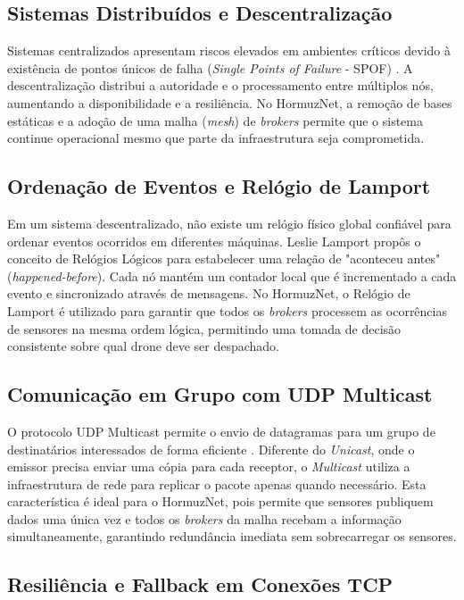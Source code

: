 \subsection{Sistemas Distribuídos e Descentralização}

Sistemas centralizados apresentam riscos elevados em ambientes críticos devido à existência de pontos únicos de falha (\textit{Single Points of Failure} - SPOF) \cite{tanenbaum2021redes}. A descentralização distribui a autoridade e o processamento entre múltiplos nós, aumentando a disponibilidade e a resiliência. No HormuzNet, a remoção de bases estáticas e a adoção de uma malha (\textit{mesh}) de \textit{brokers} permite que o sistema continue operacional mesmo que parte da infraestrutura seja comprometida.

\subsection{Ordenação de Eventos e Relógio de Lamport}

Em um sistema descentralizado, não existe um relógio físico global confiável para ordenar eventos ocorridos em diferentes máquinas. Leslie Lamport propôs o conceito de Relógios Lógicos \cite{lamport1978time} para estabelecer uma relação de "aconteceu antes" (\textit{happened-before}). Cada nó mantém um contador local que é incrementado a cada evento e sincronizado através de mensagens. No HormuzNet, o Relógio de Lamport é utilizado para garantir que todos os \textit{brokers} processem as ocorrências de sensores na mesma ordem lógica, permitindo uma tomada de decisão consistente sobre qual drone deve ser despachado.

\subsection{Comunicação em Grupo com UDP Multicast}

O protocolo UDP Multicast permite o envio de datagramas para um grupo de destinatários interessados de forma eficiente \cite{rfc1112}. Diferente do \textit{Unicast}, onde o emissor precisa enviar uma cópia para cada receptor, o \textit{Multicast} utiliza a infraestrutura de rede para replicar o pacote apenas quando necessário. Esta característica é ideal para o HormuzNet, pois permite que sensores publiquem dados uma única vez e todos os \textit{brokers} da malha recebam a informação simultaneamente, garantindo redundância imediata sem sobrecarregar os sensores.

\subsection{Resiliência e Fallback em Conexões TCP}

